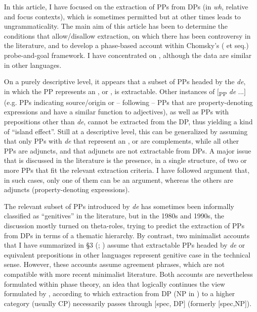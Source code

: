 \documentclass[output=paper]{langsci/langscibook}
\begin{document}
In this article, I have focused on the extraction of PPs from DPs (in \textit{wh}, relative and focus contexts), which is sometimes permitted but at other times leads to ungrammaticality. The main aim of this article has been to determine the conditions that allow/disallow extraction, on which there has been controversy in the literature, and to develop a phase-based account within Chomsky’s (\citeyear{Chomsky2000} et seq.) probe-and-goal framework. I have concentrated on , although the data are similar in other  languages.

On a purely descriptive level, it appears that a subset of PPs headed by the  \textit{de}, in which the PP represents an \AGENT, \THEME or \POSSESSOR, is extractable. Other instances of [\textsubscript{PP} \textit{de} ...] (e.g. PPs indicating source/origin or – following \citealt{Kolliakou1999} – PPs that are property-denoting expressions and have a similar function to adjectives), as well as PPs with prepositions other than \textit{de}, cannot be extracted from the DP, thus yielding a kind of “island effect”. Still at a descriptive level, this can be generalized by assuming that only PPs with \textit{de} that represent an \AGENT, \THEME or \POSSESSOR are complements, while all other PPs are adjuncts, and that adjuncts are not extractable from DPs. A major issue that is discussed in the literature is the presence, in a single structure, of two or more PPs that fit the relevant extraction criteria. I have followed  argument that, in such cases, only one of them can be an argument, whereas the others are adjuncts (property-denoting expressions).

The relevant subset of PPs introduced by \textit{de} has sometimes been informally classified as “genitives” in the literature, but in the 1980s and 1990s, the discussion mostly turned on theta-roles, trying to predict the extraction of PPs from DPs in terms of a thematic hierarchy. By contrast, two minimalist accounts that I have summarized in §3 (\citealt{Gutiérrez-Bravo2001}; \citealt{Cinque2014}) assume that extractable PPs headed by \textit{de} or equivalent prepositions in other  languages represent genitive case in the technical sense. However, these accounts assume agreement phrases, which are not compatible with more recent minimalist literature. Both accounts are nevertheless formulated within phase theory, an idea that logically continues the view formulated by \citet{Cinque1980}, according to which extraction from DP (NP in \citealt{Cinque1980}) to a higher category (usually CP) necessarily passes through [spec, DP] (formerly [spec,NP]). 
\end{document}
